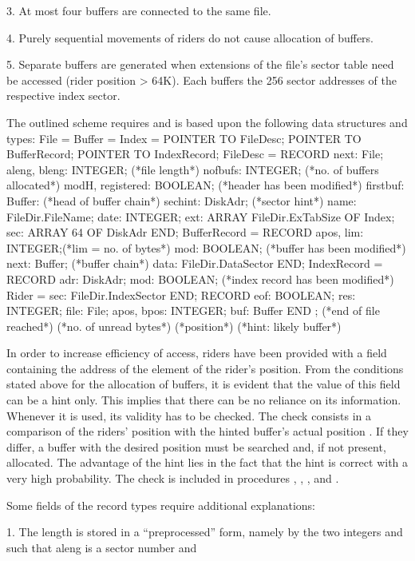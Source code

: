 3. At most four buffers are connected to the same file.

4. Purely sequential movements of riders do not cause allocation of buffers.

5. Separate buffers are generated when extensions of the file's sector table need be accessed
(rider position > 64K). Each buffers the 256 sector addresses of the respective index sector.

\noindent The outlined scheme requires and is based upon the following data structures and types:
\begintt
File = Buffer = Index =
POINTER TO FileDesc; POINTER TO BufferRecord; POINTER TO IndexRecord;
FileDesc = RECORD next: File;
aleng, bleng: INTEGER; (*file length*)
nofbufs: INTEGER; (*no. of buffers allocated*)
modH, registered: BOOLEAN; (*header has been modified*) firstbuf: Buffer: (*head of buffer chain*)
sechint: DiskAdr; (*sector hint*)
name: FileDir.FileName;
date: INTEGER;
ext: ARRAY FileDir.ExTabSize OF Index;
sec: ARRAY 64 OF DiskAdr END;
BufferRecord = RECORD apos, lim: INTEGER;(*lim = no. of bytes*) mod: BOOLEAN; (*buffer has been modified*)
next: Buffer; (*buffer chain*)
data: FileDir.DataSector END;
IndexRecord = RECORD adr: DiskAdr;
mod: BOOLEAN; (*index record has been modified*)
Rider =
sec: FileDir.IndexSector END;
RECORD eof: BOOLEAN; res: INTEGER;
file: File;
apos, bpos: INTEGER; buf: Buffer
END ;
(*end of file reached*) (*no. of unread bytes*)
(*position*)
(*hint: likely buffer*)
\endtt

\noindent In order to increase efficiency of access, riders have been provided with a field containing the address of the element of the rider's position. From the conditions stated above for the allocation of buffers, it is evident that the value of this field can be a hint only. This implies that there can be no reliance on its information. Whenever it is used, its validity has to be checked. The check consists in a comparison of the riders' position  with the hinted buffer's actual position . If they differ, a buffer with the desired position must be searched and, if not present, allocated. The advantage of the hint lies in the fact that the hint is correct with a very high probability. The check is included in procedures , , , and .

Some fields of the record types require additional explanations:

1. The length is stored in a ``preprocessed'' form, namely by the two integers  and  such that aleng is a sector number and

